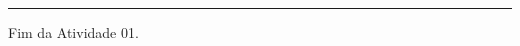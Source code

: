 \documentclass{article}
\begin{document}

\par\noindent\rule{\textwidth}{1pt}
Fim da Atividade 01.
\end{document}
